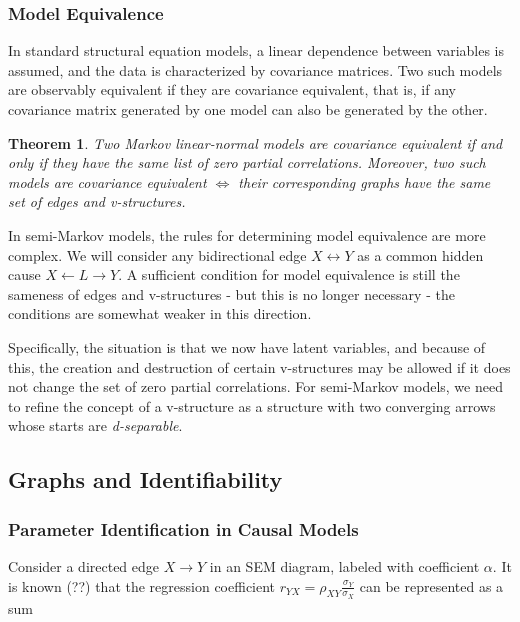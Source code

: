 \documentclass[fleqn]{article}
\newtheorem{theorem}{Theorem}
\numberwithin{equation}{section}
\numberwithin{theorem}{section}
\numberwithin{figure}{section}
\numberwithin{lemma}{section}
\numberwithin{corollary}{section}
\begin{document}
\subsubsection*{Model Equivalence}

In standard structural equation models, a linear dependence between variables is assumed, and the data is characterized by covariance matrices. Two such models are observably equivalent if they are covariance equivalent, that is, if any covariance matrix generated by one model can also be generated by the other.

\begin{theorem}
	Two Markov linear-normal models are covariance equivalent if and only if they have the same list of zero partial correlations. Moreover, two such models are covariance equivalent $\Leftrightarrow$ their corresponding graphs have the same set of edges and v-structures.
\end{theorem}

In semi-Markov models, the rules for determining model equivalence are more complex. We will consider any bidirectional edge $X \leftrightarrow Y$ as a common hidden cause $X \leftarrow L \rightarrow Y$. A sufficient condition for model equivalence is still the sameness of edges and v-structures - but this is no longer necessary - the conditions are somewhat weaker in this direction.

Specifically, the situation is that we now have latent variables, and because of this, the creation and destruction of certain v-structures may be allowed if it does not change the set of zero partial correlations. For semi-Markov models, we need to refine the concept of a v-structure as a structure with two converging arrows whose starts are \textit{d-separable}.

\subsection*{Graphs and Identifiability}

\subsubsection*{Parameter Identification in Causal Models}

Consider a directed edge $X \to Y$ in an SEM diagram, labeled with coefficient $\alpha$. It is known (??) that the regression coefficient $r_{YX} = \rho_{XY}\frac{\sigma_Y}{\sigma_X}$ can be represented as a sum
\end{document}
